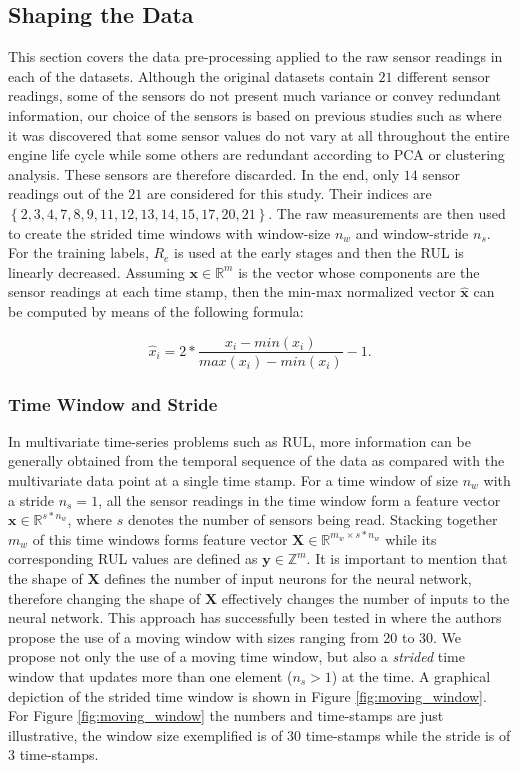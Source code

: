 \documentclass[preprint,12pt]{elsarticle}%
\begin{document}
\subsection{Shaping the Data}

This section covers the data pre-processing applied to the raw sensor readings in each of the datasets. Although the original datasets contain $21$ different sensor readings, some of the sensors do not present much variance or convey redundant information, our choice of the sensors is based on previous studies such as \cite{Lim2016, Li2018} where it was discovered that some sensor values do not vary at all throughout the entire engine life cycle while some others are redundant according to PCA or clustering analysis. These sensors are therefore discarded. In the end, only $14$ sensor readings out of the $21$ are considered for this study. Their indices are $\left\lbrace 2, 3, 4, 7, 8, 9, 11, 12, 13, 14, 15, 17, 20, 21 \right\rbrace $. The raw measurements are then used to create the strided time windows with window-size $n_{w}$ and window-stride $n_{s}$. For the training labels, $R_{e}$ is used at the early stages and then the RUL is linearly decreased. Assuming $\mathbf{x} \in \mathbb{R}^m$ is the vector whose components are the sensor readings at each time stamp, then the min-max normalized vector $\mathbf{\hat{x}}$ can be computed by means of the following formula: 

\begin{equation}
\hat{x}_{i} = 2* \frac{x_{i} - min(x_{i})}{max(x_{i}) - min(x_{i})} - 1.
\label{eq:min_max_norm}%
\end{equation}

\subsubsection{Time Window and Stride}

In multivariate time-series problems such as RUL, more information can be generally obtained from the temporal sequence of the data as compared with the multivariate data point at a single time stamp. For a time window of size $n_{w}$ with a stride $n_{s}=1$, all the sensor readings in the time window form a feature vector $\mathbf{x} \in \mathbb{R}^{s*n_w}$, where $s$ denotes the number of sensors being read. Stacking together $m_w$ of this time windows forms feature vector $\mathbf{X} \in \mathbb{R}^{m_w \times s*n_w}$ while its corresponding RUL values are defined as $\mathbf{y} \in \mathbb{Z}^m$. It is important to mention that the shape of $\mathbf{X}$ defines the number of input neurons for the neural network, therefore changing the shape of $\mathbf{X}$ effectively changes the number of inputs to the neural network. This approach has successfully been tested in \cite{Li2018,Lim2016} where the authors propose the use of a moving window with sizes ranging from 20 to 30. We propose not only the use of a moving time window, but also a \textit{strided} time window that updates more than one element ($n_s>1$) at the time. A graphical depiction of the strided time window is shown in Figure \ref{fig:moving_window}. For Figure \ref{fig:moving_window} the numbers and time-stamps are just illustrative, the window size exemplified is of 30 time-stamps while the stride is of 3 time-stamps.
\end{document}
